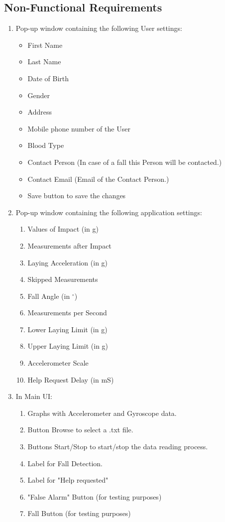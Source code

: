 \documentclass[hidelinks,conference,12pt]{IEEETran}
\begin{document}
\subsection{Non-Functional Requirements}
\begin{enumerate}
	\item Pop-up window containing the following User settings:
	\begin{itemize}
		\item First Name
		\item Last Name
		\item Date of Birth
		\item Gender
		\item Address
		\item Mobile phone number of the User
		\item Blood Type
		\item Contact Person (In case of a fall this Person will be contacted.)
		\item Contact Email (Email of the Contact Person.)
		\item Save button to save the changes
	\end{itemize}
	\item Pop-up window containing the following application settings:
	\begin{enumerate}
		\item Values of Impact (in g)
		\item Measurements after Impact
		\item Laying Acceleration (in g)
		\item Skipped Measurements
		\item Fall Angle (in $^{\circ}$)
		\item Measurements per Second
		\item Lower Laying Limit (in g)
		\item Upper Laying Limit (in g)
		\item Accelerometer Scale
		\item Help Request Delay (in mS)
	\end{enumerate}
	\item In Main UI:
	\begin{enumerate}
		\item Graphs with Accelerometer and Gyroscope data.
		\item Button Browse to select a .txt file.
		\item Buttons Start/Stop to start/stop the data reading process.
		\item Label for Fall Detection.
		\item Label for "Help requested"
		\item "False Alarm" Button (for testing purposes)
		\item Fall Button (for testing purposes)
	\end{enumerate}
\end{enumerate}
\end{document}
